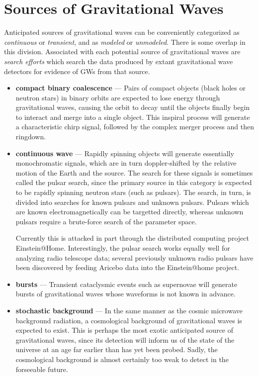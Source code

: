 \section{Sources of Gravitational Waves}
Anticipated sources of gravitational waves can be conveniently
categorized as \emph{continuous} or \emph{transient}, and as
\emph{modeled} or \emph{unmodeled}.  There is some overlap in this
division.  Associated with each potential source of gravitational
waves are \emph{search efforts} which search the data produced by
extant gravitational wave detectors for evidence of GWs from that 
source.

\begin{itemize}

\item \textbf{compact binary coalescence} --- Pairs of compact objects
  (black holes or neutron stars) in binary orbits are expected to lose
  energy through gravitational waves, causing the orbit to decay until
  the objects finally begin to interact and merge into a single
  object.  This inspiral process will generate a characteristic chirp
  signal, followed by the complex merger process and then ringdown.

\item \textbf{continuous wave} --- Rapidly spinning objects will
  generate essentially monochromatic signals, which are in turn
  doppler-shifted by the relative motion of the Earth and the source.
  The search for these signals is sometimes called the pulsar search, since the primary source
  in this category is expected to be rapidly spinning neutron stars
  (such as pulsars).  The search, in turn, is divided into searches
  for known pulsars and unknown pulsars.  Pulsars which are known
  electromagnetically can be targetted directly, whereas unknown
  pulsars require a brute-force search of the parameter space.

  Currently this is attacked in part through the distributed computing
  project Einstein@Home.  Interestingly, the pulsar search 
  works equally well for analyzing radio telescope data; 
  several previously
  unknown radio pulsars have been discovered by feeding Aricebo data
  into the Einstein@home project\cite{Knispel2010Pulsar}.  

\item \textbf{bursts} --- Transient cataclysmic events such as
  supernovae will generate bursts of gravitational waves whose
  waveforms is not known in advance.  

\item \textbf{stochastic background} --- In the same manner as the
  cosmic microwave background radiation, a cosmological background of
  gravitational waves is expected to exist.  This is perhaps the most
  exotic anticipated source of gravitational waves, since its
  detection will inform us of the state of the universe at an age far
  earlier than has yet been probed.  Sadly, the cosmological
  background is almost certainly too weak to detect in the forseeable
  future.


\end{itemize}
